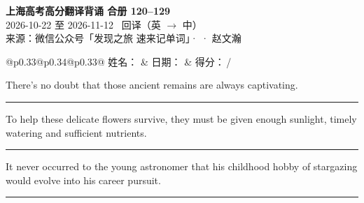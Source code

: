 \documentclass[11pt,a4paper]{article}
\newcommand{\num}[1]{\makebox[1.9em][r]{#1.}\hspace{0.3em}}
\newcommand{\wline}{\noindent\rule{\linewidth}{0.4pt}}
\begin{document}
\pagestyle{plain}
\begin{center}
{\LARGE\bfseries 上海高考高分翻译背诵 \quad 合册 120–129}\\[0.25em]
{\large 2026-10-22 至 2026-11-12 \quad\ 回译（英 $\to$ 中）}\\[0.35em]
{\footnotesize 来源：微信公众号「发现之旅 速来记单词」·  · 赵文瀚}
\end{center}

\vspace{0.4em}
\noindent\begin{tabular}{@{}p{0.33\textwidth}@{}p{0.34\textwidth}@{}p{0.33\textwidth}@{}}
姓名：\underline{\hspace{2.0cm}} & 日期：\underline{\hspace{2.0cm}} & 得分：\underline{\hspace{1.4cm}}\,/ \\
\end{tabular}

\vspace{0.5em}

\vspace{0.8em}
\vspace{0.35em}\vspace{0.15em}

\begin{minipage}{\linewidth}

\num{1}There’s no doubt that those ancient remains are always captivating.

\vspace{0.25em}

\wline

\end{minipage}

\begin{minipage}{\linewidth}

\num{2}To help these delicate flowers survive, they must be given enough sunlight, timely watering and sufficient nutrients.

\vspace{0.25em}

\wline

\end{minipage}

\begin{minipage}{\linewidth}

\num{3}It never occurred to the young astronomer that his childhood hobby of stargazing would evolve into his career pursuit.

\vspace{0.25em}

\wline

\end{minipage}
\end{document}
